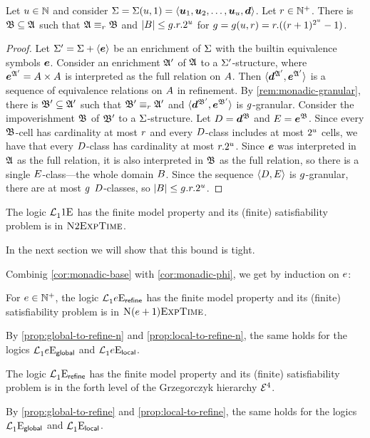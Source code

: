 \begin{remark}\label{rem:monadic-1}
Let $u \in \mathbb{N}$ and consider $\mathrm{\Sigma} = \mathrm{\Sigma}(u,1) =
\left\langle \bm{u}_{1},\bm{u}_{2},\dots,\bm{u}_{u},\bm{d} \right\rangle$. Let $r \in \mathbb{N}^{+}$.
There is $\mathfrak{B} \subseteq \mathfrak{A}$ such that $\mathfrak{A} \equiv_{r} \mathfrak{B}$ and
$\left|B\right| \leq g.r.2^u$ for $g = g(u, r) =
r.((r+1)^{2^u}-1)$.
\end{remark}
\begin{proof}
Let $\mathrm{\Sigma'} = \mathrm{\Sigma} + \left\langle \bm{e} \right\rangle$ be an enrichment of $\mathrm{\Sigma}$ with the builtin
equivalence symbols $\bm{e}$. Consider an enrichment $\mathfrak{A'}$ of $\mathfrak{A}$ to a
$\mathrm{\Sigma'}$-structure, where $\bm{e}^{\mathfrak{A'}} = {A\times A}$ is interpreted as the
full relation on $A$. Then $\langle \bm{d}^{\mathfrak{A'}}, \bm{e}^{\mathfrak{A'}} \rangle$ is a
sequence of equivalence relations on $A$ in refinement.
By \cref{rem:monadic-granular}, there is $\mathfrak{B'} \subseteq \mathfrak{A'}$ such that
$\mathfrak{B'} \equiv_{r} \mathfrak{A'}$ and $\langle \bm{d}^{\mathfrak{B'}},\bm{e}^{\mathfrak{B'}} \rangle$ is
$g$-granular.
Consider the impoverishment $\mathfrak{B}$ of $\mathfrak{B'}$ to a
$\mathrm{\Sigma}$-structure. Let $D = \bm{d}^{\mathfrak{B}}$ and $E = \bm{e}^{\mathfrak{B}}$.
Since every $\mathfrak{B}$-cell has
cardinality at most $r$ and every $D$-class includes at most $2^u$
cells, we have that every $D$-class has cardinality at most $r.2^u$.
Since $\bm{e}$ was interpreted in $\mathfrak{A}$ as the full relation, it is also
interpreted in $\mathfrak{B}$ as the full relation, so there is a single
$E$-class---the whole domain $B$.
Since the sequence $\left\langle D, E \right\rangle$ is $g$-granular, there are at most
$g$ $D$-classes, so $\left|B\right| \leq g.r.2^u$.
\end{proof}

\begin{corollary}\label{cor:monadic-base}
The logic $\mathcal{L}^{{}}_{1}{1}\mathrm{E}_{{}}$ has the finite model property and its
(finite) satisfiability problem is in $\text{\normalfont{\scshape N}}2\text{\normalfont{\scshape ExpTime}}$.

In the next section we will show that this bound is tight.
\end{corollary}

Combinig \cref{cor:monadic-base} with \cref{cor:monadic-phi}, we get by
induction on $e$:
\begin{proposition}
For $e \in \mathbb{N}^{+}$, the logic $\mathcal{L}^{{}}_{1}{e}\mathrm{E}_{\mathsf{refine}}$ has the finite
model property and its (finite) satisfiability problem is in
$\text{\normalfont{\scshape N}}(e+1)\text{\normalfont{\scshape ExpTime}}$.

By \cref{prop:global-to-refine-n} and \cref{prop:local-to-refine-n}, the same
holds for the logics $\mathcal{L}^{{}}_{1}{e}\mathrm{E}_{\mathsf{global}}$ and
$\mathcal{L}^{{}}_{1}{e}\mathrm{E}_{\mathsf{local}}$.
\end{proposition}
\begin{proposition}
The logic $\mathcal{L}^{{}}_{1}{{}}\mathrm{E}_{\mathsf{refine}}$ has the finite
model property and its (finite) satisfiability problem is in the forth level of
the Grzegorczyk hierarchy $\mathcal{E}^{4}$.

By \cref{prop:global-to-refine} and \cref{prop:local-to-refine}, the same
holds for the logics $\mathcal{L}^{{}}_{1}{{}}\mathrm{E}_{\mathsf{global}}$ and
$\mathcal{L}^{{}}_{1}{{}}\mathrm{E}_{\mathsf{local}}$.
\end{proposition}

